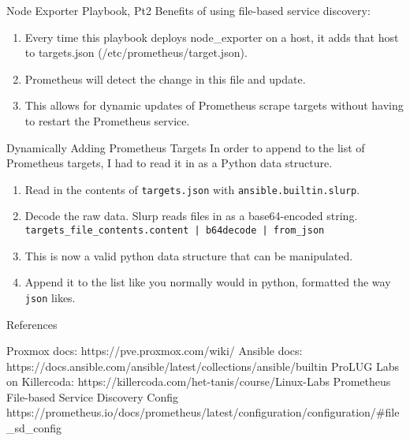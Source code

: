 \documentclass[14pt,compress,usenames,dvipsnames,aspectratio=169]{beamer}
\begin{document}
\begin{frame}{Node Exporter Playbook, Pt2}
    Benefits of using file-based service discovery:
    \begin{enumerate}
        \item{Every time this playbook deploys node\_exporter on a host, it adds 
            that host to targets.json (/etc/prometheus/target.json).} 
        \item{Prometheus will detect the change in this file and update.} 
        \item{This allows for dynamic updates of Prometheus scrape targets without
            having to restart the Prometheus service.} 
    \end{enumerate}
\end{frame}


\begin{frame}{Dynamically Adding Prometheus Targets}
    In order to append to the list of Prometheus targets, I had to read it in as a
    Python data structure.  
    \begin{enumerate}
        \item{Read in the contents of \texttt{targets.json} with
            \texttt{ansible.builtin.slurp}.  } 
        \item{Decode the raw data. Slurp reads files in as a base64-encoded string.
            \texttt{targets\_file\_contents.content | b64decode | from\_json} } 
        \item{This is now a valid python data structure that can be manipulated. } 
        \item{Append it to the list like you normally would in python, formatted the
            way \texttt{json} likes.  }
              
    \end{enumerate}
\end{frame}




\begin{frame}{References}
    
        Proxmox docs: https://pve.proxmox.com/wiki/  
        Ansible docs: https://docs.ansible.com/ansible/latest/collections/ansible/builtin  
        ProLUG Labs on Killercoda: https://killercoda.com/het-tanis/course/Linux-Labs  
        Prometheus File-based Service Discovery Config https://prometheus.io/docs/prometheus/latest/configuration/configuration/#file_sd_config  
    
\end{frame}
\end{document}

